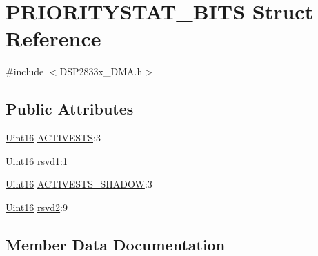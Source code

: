 \hypertarget{struct_p_r_i_o_r_i_t_y_s_t_a_t___b_i_t_s}{}\section{P\+R\+I\+O\+R\+I\+T\+Y\+S\+T\+A\+T\+\_\+\+B\+I\+T\+S Struct Reference}
\label{struct_p_r_i_o_r_i_t_y_s_t_a_t___b_i_t_s}


{\ttfamily \#include $<$D\+S\+P2833x\+\_\+\+D\+M\+A.\+h$>$}

\subsection*{Public Attributes}
\begin{DoxyCompactItemize}
\item 
\hyperlink{_d_s_p2833x___device_8h_a59a9f6be4562c327cbfb4f7e8e18f08b}{Uint16} \hyperlink{struct_p_r_i_o_r_i_t_y_s_t_a_t___b_i_t_s_a5b77eb764296a5868860cf56abad385b}{A\+C\+T\+I\+V\+E\+S\+T\+S}\+:3
\item 
\hyperlink{_d_s_p2833x___device_8h_a59a9f6be4562c327cbfb4f7e8e18f08b}{Uint16} \hyperlink{struct_p_r_i_o_r_i_t_y_s_t_a_t___b_i_t_s_abb7ee42a5d4bc116e38e2e9239883544}{rsvd1}\+:1
\item 
\hyperlink{_d_s_p2833x___device_8h_a59a9f6be4562c327cbfb4f7e8e18f08b}{Uint16} \hyperlink{struct_p_r_i_o_r_i_t_y_s_t_a_t___b_i_t_s_a355ac0403713b64a0b7409632cad6f68}{A\+C\+T\+I\+V\+E\+S\+T\+S\+\_\+\+S\+H\+A\+D\+O\+W}\+:3
\item 
\hyperlink{_d_s_p2833x___device_8h_a59a9f6be4562c327cbfb4f7e8e18f08b}{Uint16} \hyperlink{struct_p_r_i_o_r_i_t_y_s_t_a_t___b_i_t_s_aa51c7c4762b156c32286ccfd575e9b68}{rsvd2}\+:9
\end{DoxyCompactItemize}


\subsection{Member Data Documentation}
\hypertarget{struct_p_r_i_o_r_i_t_y_s_t_a_t___b_i_t_s_a5b77eb764296a5868860cf56abad385b}{}
